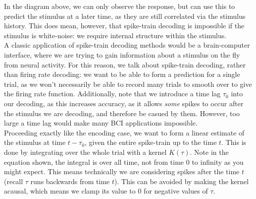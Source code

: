 \documentclass{article}
\begin{document}
\begin{figure}[H]
	\centering
\end{figure}

In the diagram above, we can only observe the response, but can use this to predict the stimulus at a later time, as they are still correlated via the stimulus history. This does mean, however, that spike-train decoding is impossible if the stimulus is white-noise: we require internal structure within the stimulus.\\

A classic application of spike-train decoding methods would be a brain-computer interface, where we are trying to gain information about a stimulus on the fly from neural activity. For this reason, we talk about spike-train decoding, rather than firing rate decoding: we want to be able to form a prediction for a single trial, as we won't necessarily be able to record many trials to smooth over to give the firing rate function. Additionally, note that we introduce a time lag $\tau_0$ into our decoding, as this increases accuracy, as it allows \textit{some} spikes to occur after the stimulus we are decoding, and therefore be casued by them. However, too large a time lag would make many BCI applications impossible.\\

Proceeding exactly like the encoding case, we want to form a linear estimate of the stimulus at time $t-\tau_0$, given the entire spike-train up to the time $t$. This is done by integrating over the whole trial with a kernel $K(\tau)$. Note in the equation shown, the integral is over all time, not from time 0 to infinity as you might expect. This means technically we are considering spikes after the time $t$ (recall $\tau$ runs backwards from time $t$). This can be avoided by making the kernel acausal, which means we clamp its value to 0 for negative values of $\tau$.
\end{document}
